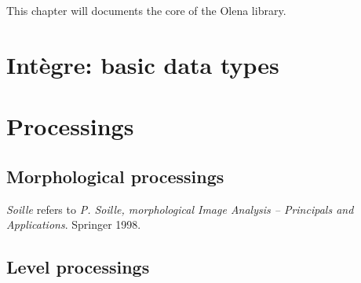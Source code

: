 \documentclass{book}
\newcommand{\integre}{Int\`egre}
\begin{document}
This chapter will documents the core of the Olena library.

\chapter{{\integre}: basic data types}


\chapter{Processings}

\section{Morphological processings}

\emph{Soille} refers to \emph{P. Soille, morphological Image Analysis
-- Principals and Applications}.  Springer 1998.



\section{Level processings}


\end{document}

